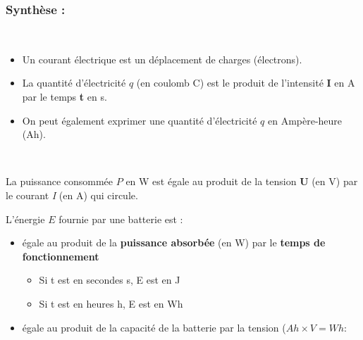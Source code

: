 \documentclass[10pt,fleqn]{article} %
\begin{document}
\subsubsection{Synthèse : }
    \begin{aretenir}~
            \begin{itemize}
                \item Un courant électrique est un déplacement de charges (électrons).
                \item La quantité d'électricité $q$ (en coulomb \si{C}) est le produit de l'intensité \textbf{I} en \si{A} par le temps \textbf{t} en \si{s}. 
                \item On peut également exprimer une quantité d'électricité $q$ en Ampère-heure (\si{Ah}).
            \end{itemize}
            \vspace{0.2cm}
        ~\hfill{}\hfill{}\hfill~
    \end{aretenir}
    
    \begin{aretenir}
        La puissance consommée $P$ en \si{W} est égale au produit de la tension \textbf{U} (en \si{V})  par le courant \textit{I} (en A) qui circule.
        
        \begin{center}
        \end{center}
        
    \end{aretenir}
    
    \begin{aretenir}
        L'énergie $E$ fournie par une batterie est : 
        \begin{itemize}
            \item égale au produit de la \textbf{puissance absorbée} (en \si{W}) par le \textbf{temps de fonctionnement}
            \begin{itemize}
                \item Si t est en secondes \si{s}, E est en \si{J}
                \item Si t est en heures \si{h}, E est en \si{Wh}
            \end{itemize}
            \begin{center}
            \end{center}
            
            \item égale au produit de la capacité de la batterie par la tension ($\si{Ah}\times\si{V} = Wh$: 
            \begin{center}
            \end{center}
        \end{itemize}
    \end{aretenir}
    
\end{document}
